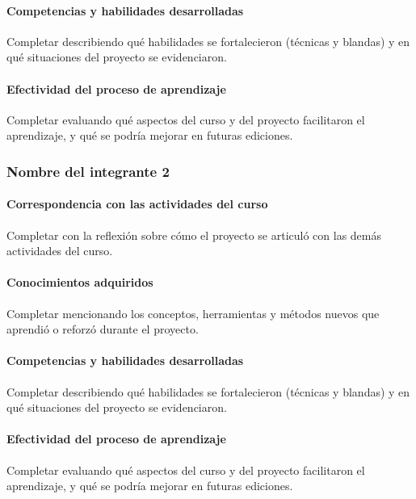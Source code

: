 \documentclass[11pt,a4paper]{article}
\begin{document}
\paragraph{Competencias y habilidades desarrolladas}

Completar describiendo qué habilidades se fortalecieron (técnicas y blandas)
y en qué situaciones del proyecto se evidenciaron.

\paragraph{Efectividad del proceso de aprendizaje}

Completar evaluando qué aspectos del curso y del proyecto facilitaron el
aprendizaje, y qué se podría mejorar en futuras ediciones.

\subsubsection*{Nombre del integrante 2}


\paragraph{Correspondencia con las actividades del curso}

Completar con la reflexión sobre cómo el proyecto se articuló con las demás
actividades del curso.

\paragraph{Conocimientos adquiridos}

Completar mencionando los conceptos, herramientas y métodos nuevos que
aprendió o reforzó durante el proyecto.

\paragraph{Competencias y habilidades desarrolladas}

Completar describiendo qué habilidades se fortalecieron (técnicas y blandas)
y en qué situaciones del proyecto se evidenciaron.

\paragraph{Efectividad del proceso de aprendizaje}

Completar evaluando qué aspectos del curso y del proyecto facilitaron el
aprendizaje, y qué se podría mejorar en futuras ediciones.
\end{document}
